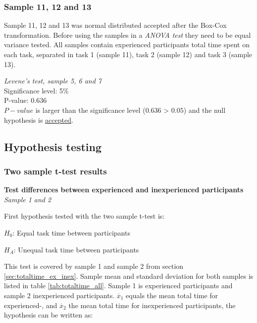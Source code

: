 \subsubsection{Sample 11, 12 and 13}\label{sec:sample5,6,7}
Sample 11, 12 and 13 was normal distributed accepted after the Box-Cox transformation. Before using the samples in a \textit{ANOVA test} they need to be equal variance tested. All samples contain experienced participants total time spent on each task, separated in task 1 (sample 11), task 2 (sample 12) and task 3 (sample 13). 

 \begin{center}
	\begin{tcolorbox}[box align=center,width=\textwidth-5cm]
		\centering
		\textit{Levene's test, sample 5, 6 and 7}\\
		Significance level: 5\%  \\[0.5cm]
		
		P-value: $0.636$\\[0.2cm]
		
		$P-value$ is larger than the significance level ($0.636$ > $0.05$) and the null hypothesis is \underline{accepted}.\\[0.5cm]
	\end{tcolorbox} 
\end{center}


\subsection{Hypothesis testing}\label{sec:hypothesis_results}

\subsubsection{Two sample t-test results}\label{sec:t-test_result}

\textbf{Test differences between experienced and inexperienced participants}\\
\textit{Sample 1 and 2}\newline

First hypothesis tested with the two sample t-test is: \\[0.3cm]

\centerline{$H_{0}$: Equal task time between participants} 
\centerline{$H_{A}$: Unequal task time between participants}

\vspace{0.3cm}

This test is covered by sample 1 and sample 2 from section \ref{sec:totaltime_ex_inex}. Sample mean and standard deviation for both samples is listed in table \ref{tab:totaltime_all}. Sample 1 is experienced participants and sample 2 inexperienced participants. $\overline{x}_1$ equals the mean total time for experienced-, and $\overline{x}_2$ the mean total time for inexperienced participants, the hypothesis can be written as:\\[0.3cm]

